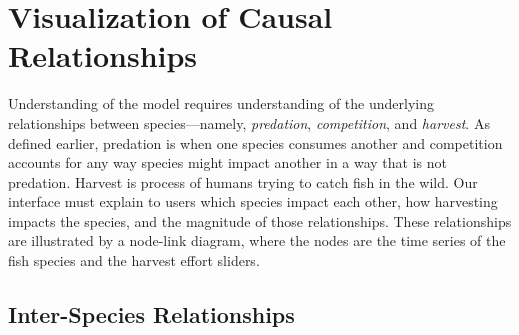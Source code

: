 \section{Visualization of Causal Relationships}

Understanding of the model requires understanding of the underlying relationships between species---namely, \textit{predation}, \textit{competition}, and \textit{harvest}.  As defined earlier, predation is when one species consumes another and competition accounts for any way species might impact another in a way that is not predation.  Harvest is process of humans trying to catch fish in the wild.  Our interface must explain to users which species impact each other, how harvesting impacts the species, and the magnitude of those relationships.  These relationships are illustrated by a node-link diagram, where the nodes are the time series of the fish species and the harvest effort sliders.

\subsection{Inter-Species Relationships}

